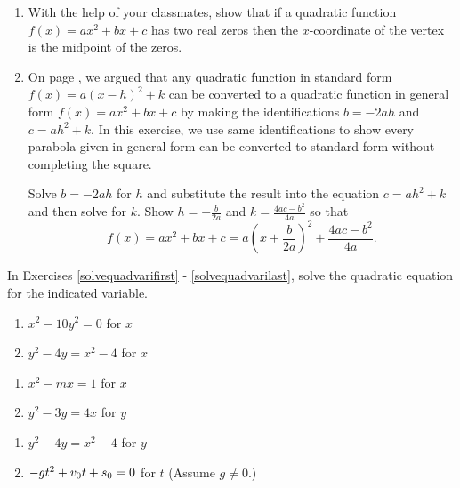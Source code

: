 \begin{enumerate}
\item With the help of your classmates, show that if a quadratic function $f(x) = ax^{2} + bx + c$ has two real zeros then the $x$-coordinate of the vertex is the midpoint of the zeros.

\item  \label{avoidcompsquare}  On page \pageref{standardtogeneraldiscussion}, we argued that any quadratic function in standard form $f(x) = a(x-h)^2+k$ can be converted to a quadratic function in general form $f(x) = ax^2+bx+c$ by making the identifications $b=-2ah$ and $c = ah^2+k$.  In this exercise, we use same identifications to show every parabola given in general form can be converted to standard form without completing the square.

\smallskip

Solve $b=-2ah$ for $h$ and substitute the result into the equation $c = ah^2+k$ and then solve for $k$.  Show  $h = -\frac{b}{2a}$ and $k = \frac{4ac-b^2}{4a}$ so that \[ f(x) = ax^2+bx+c = a\left(x + \dfrac{b}{2a}\right)^2  + \dfrac{4ac - b^2}{4a}. \]

\setcounter{HW}{\value{enumi}}
\end{enumerate}

In Exercises \ref{solvequadvarifirst} - \ref{solvequadvarilast}, solve the quadratic equation for the indicated variable.

\begin{multicols}{2}
\begin{enumerate}
\setcounter{enumi}{\value{HW}}


\item $x^{2} - 10y^{2} = 0$ for $x$ \label{solvequadvarifirst}
\item $y^{2} - 4y = x^{2} - 4$ for $x$

\setcounter{HW}{\value{enumi}}
\end{enumerate}
\end{multicols}

\begin{multicols}{2}
\begin{enumerate}
\setcounter{enumi}{\value{HW}}

\item $x^{2} - mx = 1$ for $x$
\item $y^{2} - 3y = 4x$ for $y$

\setcounter{HW}{\value{enumi}}
\end{enumerate}
\end{multicols}

\begin{multicols}{2}
\begin{enumerate}
\setcounter{enumi}{\value{HW}}



\item $y^{2} - 4y = x^{2} - 4$ for $y$
\item $-gt^{2} + v_{\mbox{\scriptsize $0$}}t + s_{\mbox{\scriptsize $0$}} = 0$ for $t$ (Assume $g \neq 0$.) \label{solvequadvarilast}

\setcounter{HW}{\value{enumi}}
\end{enumerate}
\end{multicols}

